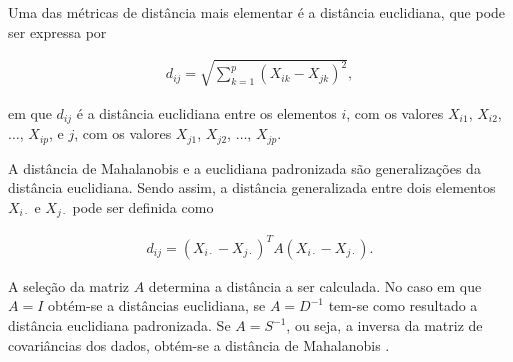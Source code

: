 \documentclass[
	12pt,				%
	openright,			%
	oneside,			%
	a4paper,			%
	chapter=TITLE,		%
	section=TITLE,		%
	english,			%
	french,				%
	spanish,			%
	brazil				%
	]{abntex2}
\begin{document}



Uma das métricas de distância mais elementar é a distância euclidiana, que pode ser expressa por 

\begin{align*}
d_{ij} = \sqrt{\sum_{k = 1}^{p}(X_{ik} - X_{jk})^2},
\end{align*}

\noindent em que $d_{ij}$ é a distância euclidiana entre os elementos $i$, com os valores $X_{i1}$, $X_{i2}$, $\dots$, $X_{ip}$, e $j$, com os valores $X_{j1}$, $X_{j2}$, $\dots$, $X_{jp}$.

A distância de Mahalanobis e a euclidiana padronizada são generalizações da distância euclidiana. Sendo assim, a distância generalizada entre dois elementos $X_{i\cdot}$ e $X_{j\cdot}$ pode ser definida como  


\begin{align}
	d_{ij} = (X_{i\cdot} - X_{j\cdot})^T A(X_{i\cdot} - X_{j\cdot}). 
\end{align}

A seleção da matriz $A$ determina a distância a ser calculada. No caso em que $A= I$ obtém-se a distâncias euclidiana, se $A= D^{-1}$ tem-se como resultado a distância euclidiana padronizada. Se $A= S^{-1}$, ou seja, a inversa da matriz de covariâncias dos dados, obtém-se a distância de Mahalanobis \cite{mingoti10}.

\end{document}
